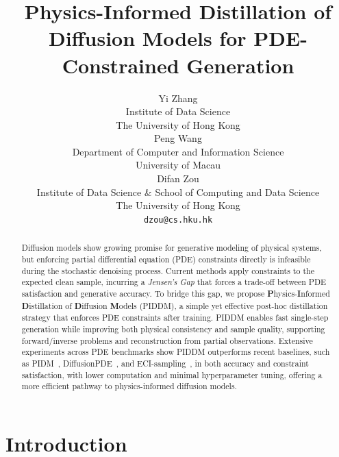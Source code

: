 \documentclass{article}
\title{Physics-Informed Distillation of Diffusion Models for PDE-Constrained Generation}
\author{%
  Yi Zhang\\
  Institute of Data Science\\
  The University of Hong Kong\\
  \And
  Peng Wang\\
  Department of Computer and Information Science\\
  University of Macau\\
  \And
  Difan Zou\\
  Institute of Data Science \& School of Computing and Data Science\\
  The University of Hong Kong\\
  \texttt{dzou@cs.hku.hk}
}
\theoremstyle{plain}
\theoremstyle{definition}
\theoremstyle{remark}
\def\vx{{\bm{x}}}
\begin{document}
\maketitle

\begin{abstract}
Diffusion models show growing promise for generative modeling of physical systems, but enforcing partial differential equation (PDE) constraints directly is infeasible during the stochastic denoising process. Current methods apply constraints to the expected clean sample, incurring a \textit{Jensen's Gap} that forces a trade-off between PDE satisfaction and generative accuracy. To bridge this gap, we propose \textbf{P}hysics-\textbf{I}nformed \textbf{D}istillation of \textbf{D}iffusion \textbf{M}odels (PIDDM), a simple yet effective post-hoc distillation strategy that enforces PDE constraints after training. PIDDM enables fast single-step generation while improving both physical consistency and sample quality, supporting forward/inverse problems and reconstruction from partial observations. Extensive experiments across PDE benchmarks show PIDDM outperforms recent baselines, such as PIDM~\cite{bastek2025pdim}, DiffusionPDE~\cite{huang2024diffusionpde}, and ECI-sampling~\cite{cheng2025eci}, in both accuracy and constraint satisfaction, with lower computation and minimal hyperparameter tuning, offering a more efficient pathway to physics-informed diffusion models.
\end{abstract}

\section{Introduction}

\end{document}
